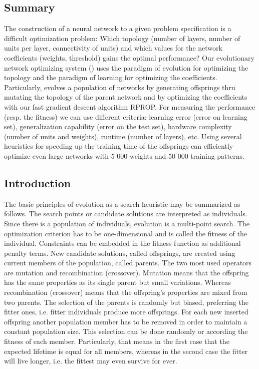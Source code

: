 \subsection*{Summary}
The construction of a neural network to a given problem specification
is a difficult optimization problem: Which topology (number of layers,
number of units per layer, connectivity of units) and which values for
the network coefficients (weights, threshold) gains the optimal
performance?  Our evolutionary network optimizing system (\ENZO) uses
the paradigm of evolution for optimizing the topology and the paradigm
of learning for optimizing the coefficients.  Particularly, \ENZO
evolves a population of networks by generating offsprings thru
mutating the topology of the parent network and by optimizing the
coefficients with our fast gradient descent algorithm RPROP.  For
measuring the performance (resp. the fitness) we can use different
criteria: learning error (error on learning set), generalization
capability (error on the test set), hardware complexity (number of
units and weights), runtime (number of layers), etc.  Using several
heuristics for speeding up the training time of the offsprings \ENZO
can efficiently optimize even large networks with 5 000 weights and 50
000 training patterns.  
 

\subsection{Introduction }                                        

The basic principles of evolution as a search heuristic may be
summarized as follows. The search points or candidate solutions are
interpreted as individuals. Since there is a population of
individuals, evolution is a multi-point search. The optimization
criterion has to be one-dimensional and is called the fitness of the
individual. Constraints can be embedded in the fitness function as
additional penalty terms. New candidate solutions, called offsprings,
are created using current members of the population, called parents.
The two most used operators are mutation and recombination
(crossover). Mutation means that the offspring has the same properties
as its single parent but small variations. Whereas recombination
(crossover) means that the offspring's properties are mixed from two
parents. The selection of the parents is randomly but biased,
preferring the fitter ones, i.e. fitter individuals produce more
offsprings. For each new inserted offspring another population member
has to be removed in order to maintain a constant population
size. This selection can be done randomly or according the fitness of
each member. Particularly, that means in the first case that the
expected lifetime is equal for all members, whereas in the second case
the fitter will live longer, i.e. the fittest may even survive for
ever.

